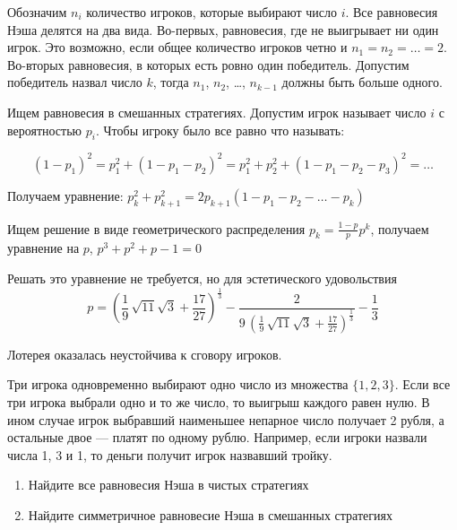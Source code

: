 \begin{solution}
Обозначим $n_i$ количество игроков, которые выбирают число $i$. Все равновесия Нэша делятся на два вида. Во-первых, равновесия, где не выигрывает ни один игрок. Это возможно, если общее количество игроков четно и $n_1=n_2=\ldots=2$. Во-вторых равновесия, в которых есть ровно один победитель. Допустим победитель назвал число $k$, тогда $n_1$, $n_2$, \ldots, $n_{k-1}$ должны быть больше одного.

Ищем равновесия в смешанных стратегиях. Допустим игрок называет число $i$  с вероятностью $p_i$. Чтобы игроку было все равно что называть:


\[
(1-p_1)^2 = p_1^2+(1-p_1-p_2)^2 = p_1^2+p_2^2+(1-p_1-p_2-p_3)^2 =\ldots
\]

Получаем уравнение:
$p_{k}^{2}+p_{k+1}^{2}=2p_{k+1}(1-p_{1}-p_{2}-\ldots -p_{k})$

Ищем решение в виде геометрического распределения $p_{k}=\frac{1-p}{p}p^{k}$, получаем уравнение на $p$, 
$p^{3}+p^{2}+p-1=0$ 

Решать это уравнение не требуется, но для эстетического удовольствия
\[
p = {\left(\frac{1}{9} \, \sqrt{11} \sqrt{3} + \frac{17}{27}\right)}^{\frac{1}{3}} - \frac{2}{9 \, {\left(\frac{1}{9} \, \sqrt{11} \sqrt{3} + \frac{17}{27}\right)}^{\frac{1}{3}}} - \frac{1}{3}
\]

Лотерея оказалась неустойчива к сговору игроков.  
\end{solution}


\begin{problem}
Три игрока одновременно выбирают одно число из множества $\{1,2,3\}$. Если все три игрока выбрали одно и то же число, то выигрыш каждого равен нулю. В ином случае игрок выбравший наименьшее непарное число получает 2 рубля, а остальные двое --- платят по одному рублю. Например, если игроки назвали числа 1, 3 и 1, то деньги получит игрок назвавший тройку. 
\begin{enumerate}
\item  Найдите все равновесия Нэша в чистых стратегиях 
\item  Найдите симметричное равновесие Нэша в смешанных стратегиях 
\end{enumerate}
\end{problem}

